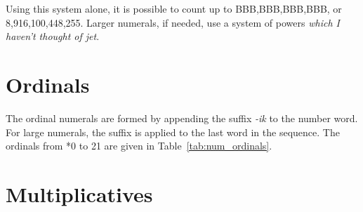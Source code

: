 \documentclass[grammar]{subfiles}
\begin{document}
	Using this system alone, it is possible to count up to BBB,BBB,BBB,BBB\duo, or 8,916,100,448,255\dec. Larger numerals, if needed, use a system of powers \emph{which I haven't thought of jet}.

	\section{Ordinals}
	\label{sec:num_ordinals}
	
	The ordinal numerals are formed by appending the suffix \emph{-ik} to the number word. For large numerals, the suffix is applied to the last word in the sequence. The ordinals from *0 to 21\dec{} are given in Table~\ref{tab:num_ordinals}.

	\begin{table}[htpb]\small\capstart
		\begin{center}
			\qquad
			\caption{Ordinal numerals from 0\dec\ to 21\dec\label{tab:num_ordinals}}
		\end{center}
	\end{table}

	\section{Multiplicatives}
	\label{sec:num_multiplicatives}
\end{document}
